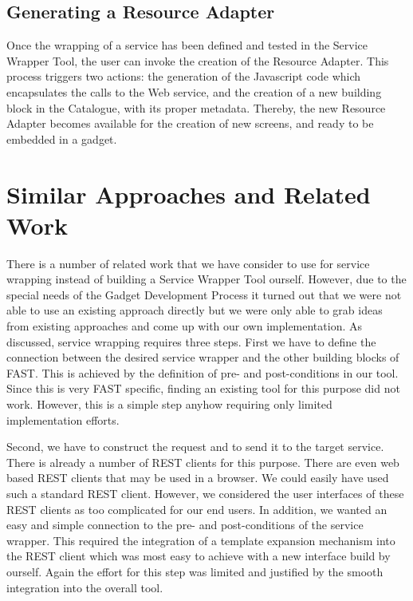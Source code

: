 \documentclass{fast_latex}
\begin{document}


\subsection{Generating a Resource Adapter} %
\label{sub:generating_a_resource_adapter}

Once the wrapping of a service has been defined and tested in the Service Wrapper Tool, the user can invoke the creation of the Resource Adapter. This process triggers two actions: the generation of the Javascript code which encapsulates the calls to the Web service, and the creation of a new building block in the Catalogue, with its proper metadata. Thereby, the new Resource Adapter becomes available for the creation of new screens, and ready to be embedded in a gadget.



\clearpage
\section{Similar Approaches and Related Work} %
\label{sec:related_work}

There is a number of related work that we have consider to use for service wrapping instead of building a Service Wrapper
Tool ourself. However, due to the special needs of the Gadget Development Process it turned out that we were not able 
to use an existing approach directly but we were only able to grab ideas from existing approaches and come up with our own implementation. 
As discussed, service wrapping requires three steps. First we have to define the connection between the desired service wrapper and the other building blocks of FAST. This is achieved by the definition of pre- and post-conditions in our tool. Since this is very FAST specific, finding an existing tool for this purpose did not work. However, this is a simple step anyhow requiring only limited implementation efforts. 

Second, we have to construct the request and to send it to the target service. There is already a number of REST clients 
for this purpose. There are even web based REST clients that may be used in a browser. We could easily have used such 
a standard REST client. However, we considered the user interfaces of these REST clients as too complicated for our
end users. In addition, we wanted an easy and simple connection to the pre- and post-conditions of the service wrapper. 
This required the integration of a template expansion mechanism into the REST client which was most easy to achieve 
with a new interface build by ourself. Again the effort for this step was limited and justified by the smooth integration into the overall tool. 
\end{document}
